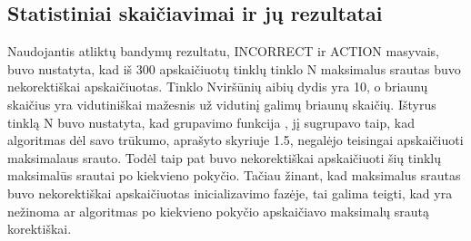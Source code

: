 \subsection{Statistiniai skaičiavimai ir jų rezultatai}

Naudojantis atliktų bandymų rezultatu, INCORRECT ir ACTION masyvais, buvo nustatyta, kad iš 300 apskaičiuotų tinklų tinklo N maksimalus srautas buvo nekorektiškai apskaičiuotas. Tinklo Nviršūnių aibių dydis yra 10, o briaunų skaičius yra vidutiniškai mažesnis už vidutinį galimų briaunų skaičių. Ištyrus tinklą N buvo nustatyta, kad grupavimo funkcija , jį sugrupavo taip, kad algoritmas dėl savo trūkumo, aprašyto skyriuje 1.5, negalėjo teisingai apskaičiuoti maksimalaus srauto. Todėl taip pat buvo nekorektiškai apskaičiuoti šių tinklų maksimalūs srautai po kiekvieno pokyčio. Tačiau žinant, kad maksimalus srautas buvo nekorektiškai apskaičiuotas inicializavimo fazėje, tai galima teigti, kad yra nežinoma ar algoritmas po kiekvieno pokyčio apskaičiavo maksimalų srautą korektiškai.


